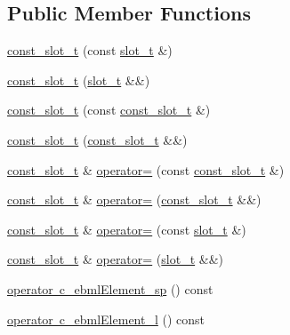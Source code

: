 \subsection*{Public Member Functions}
\begin{DoxyCompactItemize}
\item 
\mbox{\hyperlink{classebml_1_1const__slot__t_a4aec17cc48cae68d78d65080ca5de7cc}{const\+\_\+slot\+\_\+t}} (const \mbox{\hyperlink{classebml_1_1slot__t}{slot\+\_\+t}} \&)
\item 
\mbox{\hyperlink{classebml_1_1const__slot__t_a27268c3669f22a8927bf0463c6a59bea}{const\+\_\+slot\+\_\+t}} (\mbox{\hyperlink{classebml_1_1slot__t}{slot\+\_\+t}} \&\&)
\item 
\mbox{\hyperlink{classebml_1_1const__slot__t_a2797f5e71cc28e8fc824689e09a782c9}{const\+\_\+slot\+\_\+t}} (const \mbox{\hyperlink{classebml_1_1const__slot__t}{const\+\_\+slot\+\_\+t}} \&)
\item 
\mbox{\hyperlink{classebml_1_1const__slot__t_ae455f923bf8676e60ad95dc2cc8233e9}{const\+\_\+slot\+\_\+t}} (\mbox{\hyperlink{classebml_1_1const__slot__t}{const\+\_\+slot\+\_\+t}} \&\&)
\item 
\mbox{\hyperlink{classebml_1_1const__slot__t}{const\+\_\+slot\+\_\+t}} \& \mbox{\hyperlink{classebml_1_1const__slot__t_a7ef30a5acf5158523b8121bf244d69eb}{operator=}} (const \mbox{\hyperlink{classebml_1_1const__slot__t}{const\+\_\+slot\+\_\+t}} \&)
\item 
\mbox{\hyperlink{classebml_1_1const__slot__t}{const\+\_\+slot\+\_\+t}} \& \mbox{\hyperlink{classebml_1_1const__slot__t_af3fa86ec0bd3c82a66341104dda7d5d1}{operator=}} (\mbox{\hyperlink{classebml_1_1const__slot__t}{const\+\_\+slot\+\_\+t}} \&\&)
\item 
\mbox{\hyperlink{classebml_1_1const__slot__t}{const\+\_\+slot\+\_\+t}} \& \mbox{\hyperlink{classebml_1_1const__slot__t_acc0413803e05c5e0c30769fd3ac7ada9}{operator=}} (const \mbox{\hyperlink{classebml_1_1slot__t}{slot\+\_\+t}} \&)
\item 
\mbox{\hyperlink{classebml_1_1const__slot__t}{const\+\_\+slot\+\_\+t}} \& \mbox{\hyperlink{classebml_1_1const__slot__t_aca8bbae51d5729db43bc5e089774e3d2}{operator=}} (\mbox{\hyperlink{classebml_1_1slot__t}{slot\+\_\+t}} \&\&)
\item 
\mbox{\hyperlink{classebml_1_1const__slot__t_aa95ed54562688890695d40e9fe2a4774}{operator c\+\_\+ebml\+Element\+\_\+sp}} () const
\item 
\mbox{\hyperlink{classebml_1_1const__slot__t_a76ad8cc4fee84605d0c5cbcf64b14bc6}{operator c\+\_\+ebml\+Element\+\_\+l}} () const

\end{DoxyCompactItemize}
